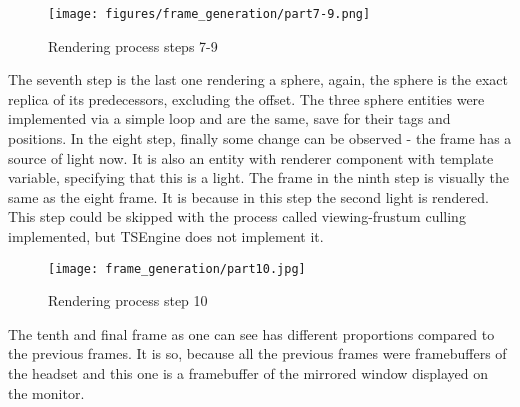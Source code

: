 \begin{figure}[H]
  \texttt{[image: figures/frame\_generation/part7-9.png]}
  \caption{Rendering process steps 7-9}
\end{figure}
The seventh step is the last one rendering a sphere, again, the sphere is the exact replica of its predecessors, excluding the offset. The three sphere entities were implemented via a simple loop and are the same, save for their tags and positions.
In the eight step, finally some change can be observed - the frame has a source of light now. It is also an entity with renderer component with template variable, specifying that this is a light.
The frame in the ninth step is visually the same as the eight frame. It is because in this step the second light is rendered. This step could be skipped with the process called viewing-frustum culling implemented, but TSEngine does not implement it. 
\begin{figure}[H]
  \texttt{[image: frame\_generation/part10.jpg]}
  \caption{Rendering process step 10}
\end{figure}
The tenth and final frame as one can see has different proportions compared to the previous frames. It is so, because all the previous frames were framebuffers of the headset and this one is a framebuffer of the mirrored window displayed on the monitor.
